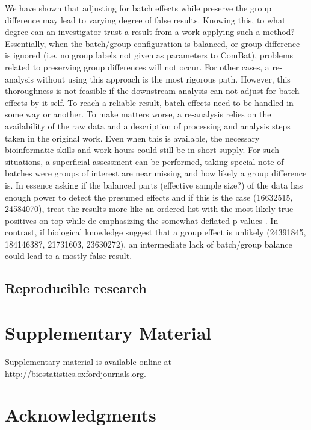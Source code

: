 \documentclass{bio}
\begin{document}
We have shown that adjusting for batch effects while preserve the group difference may lead to varying degree of false results. Knowing this, to what degree can an investigator trust a result from a work applying such a method? Essentially, when the batch/group configuration is balanced, or group difference is ignored  (i.e. no group labels not given as parameters to ComBat), problems related to preserving group differences will not occur. For other cases, a re-analysis without using this approach is the most rigorous path. However, this thoroughness is not feasible if the downstream  analysis can not adjust for batch effects by it self. To reach a reliable result, batch effects need to be handled in some way or another. To make matters worse, a re-analysis relies on the availability of the raw data and a description of processing and analysis steps taken in the original work. Even when this is available, the necessary bioinformatic skills and work hours could still be in short supply. For such situations, a superficial assessment can be performed, taking special note of batches were groups of interest are near missing and how likely a group difference is. In essence asking if the balanced parts (effective sample size?) of the data has enough power to detect the presumed effects and if this is the case (16632515, 24584070), treat the results more like an ordered list with the most likely true positives on top while de-emphasizing the somewhat deflated p-values . In contrast, if biological knowledge suggest that a group effect is unlikely  (24391845, 18414638?, 21731603, 23630272), an intermediate lack of batch/group balance  could lead to a mostly false result.

\subsection{Reproducible research}


\section{Supplementary Material}
\label{supp}

Supplementary material is available online at
\href{http://biostatistics.oxfordjournals.org}%
{http://biostatistics.oxfordjournals.org}.


\section*{Acknowledgments}
\end{document}
